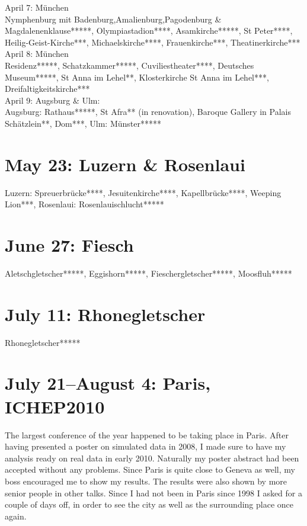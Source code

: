 April 7: M\"unchen\\
Nymphenburg mit Badenburg,Amalienburg,Pagodenburg \& Magdalenenklause*****, Olympiastadion****, Asamkirche*****, St Peter****, Heilig-Geist-Kirche***, Michaelskirche****, Frauenkirche***, Theatinerkirche***\\

April 8: M\"unchen\\
Residenz*****, Schatzkammer*****, Cuviliestheater****, Deutsches Museum*****, St Anna im Lehel**, Klosterkirche St Anna im Lehel***, Dreifaltigkeitskirche***\\

April 9: Augsburg \& Ulm:\\
Augsburg: Rathaus*****, St Afra** (in renovation), Baroque Gallery in Palais Sch\"atzlein**, Dom***, Ulm: M\"unster*****

\section{May 23: Luzern \& Rosenlaui}
\label{2010:Luzern}

Luzern: Spreuerbr\"ucke****, Jesuitenkirche****, Kapellbr\"ucke****, Weeping Lion***, Rosenlaui: Rosenlauischlucht*****

\section{June 27: Fiesch}
\label{Fiesch2010}

Aletschgletscher*****, Eggishorn*****, Fieschergletscher*****, Moosfluh*****

\section{July 11: Rhonegletscher}
\label{Rhonegletscher2010}

Rhonegletscher*****

\section{July 21--August 4: Paris, ICHEP2010}
\label{Paris2010}

The largest conference of the year happened to be taking place in Paris. After having presented a poster on simulated data in 2008, I made sure to have my analysis ready on real data in early 2010. Naturally my poster abstract had been accepted without any problems. Since Paris is quite close to Geneva as well, my boss encouraged me to show my results. The results were also shown by more senior people in other talks. Since I had not been in Paris since 1998 I asked for a couple of days off, in order to see the city as well as the surrounding place once again.\\

